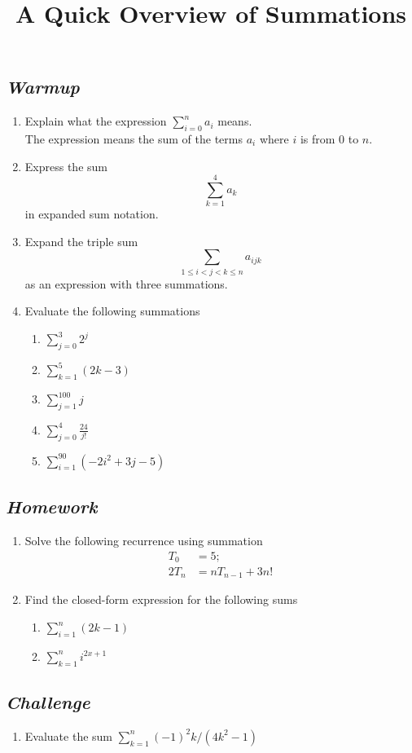 \documentclass{cslessonsolutions}
\title{A Quick Overview of Summations}
\begin{document}
\maketitle
\subsection*{\textit{Warmup}}
\begin{enumerate}[listparindent=0.7cm, align=left]
\item Explain what the expression $\sum^n_{i=0}a_i$ means.\\
The expression means the sum of the terms $a_i$ where $i$ is from 0 to $n$.
\item Express the sum \begin{equation*}\sum^4_{k=1}a_k\end{equation*} in expanded sum notation.
\item Expand the triple sum \begin{equation*}\sum_{1 \leq i < j < k \leq n}a_{ijk}\end{equation*} as an expression with three summations.
\item Evaluate the following summations
\begin{enumerate}[label=(\alph*), listparindent=0.7cm, align=left]
    \item $\sum^3_{j=0}2^j$
    \item $\sum^5_{k=1}(2k-3)$
    \item $\sum^{100}_{j=1}j$
    \item $\sum^{4}_{j=0}{\frac{24}{j!}}$
    \item $\sum^{90}_{i=1}{(-2i^2+3j-5)}$
\end{enumerate}
\end{enumerate}

\subsection*{\textit{Homework}}
\begin{enumerate}[listparindent=0.7cm, align=left]
\item Solve the following recurrence using summation
\begin{align*}
    T_0&=5;\\
    2T_n&=nT_{n-1}+3n!
\end{align*}
\item Find the closed-form expression for the following sums
\begin{enumerate}[label=(\alph*), listparindent=0.7cm, align=left]
\item $\sum^n_{i=1}(2k-1)$
\item $\sum^n_{k=1}{i^{2x+1}}$
\end{enumerate}
\end{enumerate}

\subsection*{\textit{Challenge}}
\begin{enumerate}[label=(\alph*), listparindent=0.7cm, align=left]
\item Evaluate the sum $\sum^n_{k=1}(-1)^2k/(4k^2-1)$
\end{enumerate}
\end{document}
